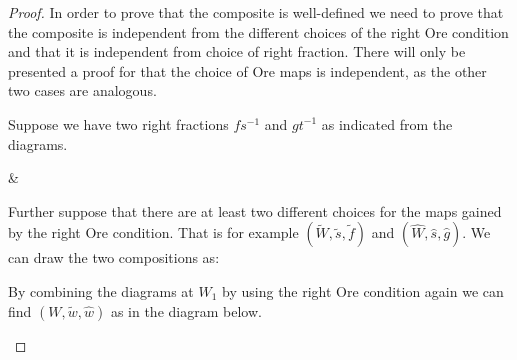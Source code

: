 \documentclass[11pt]{article}
\theoremstyle{definition}
\theoremstyle{remark}
\begin{document}
            \begin{proof}
                In order to prove that the composite is well-defined we need to prove that the composite is independent from the different choices of the right Ore condition and that it is independent from choice of right fraction. There will only be presented a proof for that the choice of Ore maps is independent, as the other two cases are analogous.

                Suppose we have two right fractions $fs^{-1}$ and $gt^{-1}$ as indicated from the diagrams.
                \begin{center}
                    \&
                \end{center}
                Further suppose that there are at least two different choices for the maps gained by the right Ore condition. That is for example $(\widetilde{W},\widetilde{s},\widetilde{f})$ and $(\widehat{W},\widehat{s}, \widehat{g})$. We can draw the two compositions as:
                \begin{center}
                \end{center}
                By combining the diagrams at $W_1$ by using the right Ore condition again we can find $(W, \widetilde{w}, \widehat{w})$ as in the diagram below. 
                \begin{center}
\end{center}
\end{proof}
\end{document}
